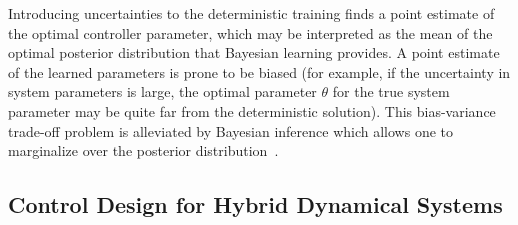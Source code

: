 \begin{rem}
    Introducing uncertainties to the deterministic training finds a point
    estimate of the optimal controller parameter, which may be interpreted as
    the mean of the optimal posterior distribution that Bayesian learning
    provides. A point estimate of the learned parameters is prone to be biased
    (for example, if the uncertainty in system parameters is large, the optimal
    parameter $\theta$ for the true system parameter may be quite far from the
    deterministic solution). This bias-variance trade-off problem is alleviated
    by Bayesian inference which allows one to marginalize over the posterior
    distribution~\cite{bishop2006pattern}.
\end{rem}



\subsection{Control Design for Hybrid Dynamical Systems}
\label{ssec:pbc_hybrid}


